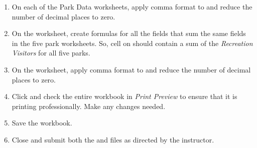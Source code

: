 \begin{enumerate}[resume]
	\item On each of the Park Data worksheets, apply comma format to  and reduce the number of decimal places to zero.
	\item On the  worksheet, create formulas for all the fields that sum the same fields in the five park worksheets. So, cell  on  should contain a sum of the \textit{Recreation Visitors} for all five parks.
	\item On the  worksheet, apply comma format to  and reduce the number of decimal places to zero.
	\item Click  and check the entire workbook in \textit{Print Preview} to ensure that it is printing professionally. Make any changes needed.
	\item Save the  workbook.
	\item Close and submit both the  and  files as directed by the instructor.
\end{enumerate}
